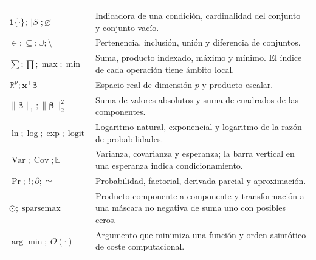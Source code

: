 \begin{longtable}{>{\raggedright\arraybackslash}p{.25\linewidth}>{\raggedright\arraybackslash}p{.69\linewidth}}
\midrule
\multicolumn{2}{l}{\textbf{Operadores y convenciones transversales}}\\*
$\mathbf1\{\cdot\};\ |S|;\varnothing$ & Indicadora de una condición, cardinalidad del conjunto y conjunto vacío.\\
$\in;\subseteq;\cup;\setminus$ & Pertenencia, inclusión, unión y diferencia de conjuntos.\\
$\sum;\prod;\max;\min$ & Suma, producto indexado, máximo y mínimo. El índice de cada operación tiene ámbito local.\\
$\mathbb R^p;\mathbf x^\top\boldsymbol\beta$ & Espacio real de dimensión $p$ y producto escalar.\\
$\lVert\boldsymbol\beta\rVert_1;\lVert\boldsymbol\beta\rVert_2^2$ & Suma de valores absolutos y suma de cuadrados de las componentes.\\
$\ln;\log;\exp;\operatorname{logit}$ & Logaritmo natural, exponencial y logaritmo de la razón de probabilidades.\\
$\operatorname{Var};\operatorname{Cov};\mathbb E$ & Varianza, covarianza y esperanza; la barra vertical en una esperanza indica condicionamiento.\\
$\Pr;\ {!};\partial;\simeq$ & Probabilidad, factorial, derivada parcial y aproximación.\\
$\odot;\operatorname{sparsemax}$ & Producto componente a componente y transformación a una máscara no negativa de suma uno con posibles ceros.\\
$\arg\min;\ O(\cdot)$ & Argumento que minimiza una función y orden asintótico de coste computacional.\\
\end{longtable}\endgroup

